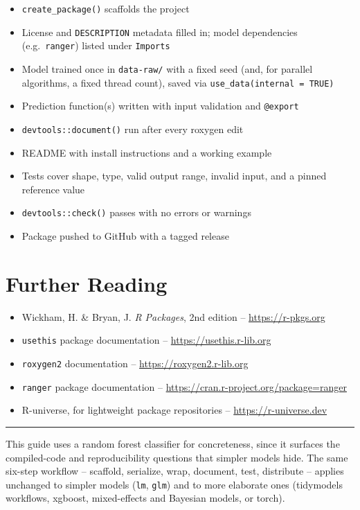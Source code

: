 \documentclass[11pt]{article}
\begin{document}
\begin{tcolorbox}[breakable, enhanced, colback=green!4, colframe=green!40!black,
  boxrule=0.6pt, arc=2pt, left=8pt, right=8pt, top=6pt, bottom=6pt]
\begin{itemize}[itemsep=3pt, leftmargin=1.4em]
  \item[\textbf{$\square$}] \texttt{create\_package()} scaffolds the project
  \item[\textbf{$\square$}] License and \texttt{DESCRIPTION} metadata filled in; model dependencies (e.g.\ \texttt{ranger}) listed under \texttt{Imports}
  \item[\textbf{$\square$}] Model trained once in \texttt{data-raw/} with a fixed seed (and, for parallel algorithms, a fixed thread count), saved via \texttt{use\_data(internal = TRUE)}
  \item[\textbf{$\square$}] Prediction function(s) written with input validation and \texttt{@export}
  \item[\textbf{$\square$}] \texttt{devtools::document()} run after every roxygen edit
  \item[\textbf{$\square$}] README with install instructions and a working example
  \item[\textbf{$\square$}] Tests cover shape, type, valid output range, invalid input, and a pinned reference value
  \item[\textbf{$\square$}] \texttt{devtools::check()} passes with no errors or warnings
  \item[\textbf{$\square$}] Package pushed to GitHub with a tagged release
\end{itemize}
\end{tcolorbox}

\section{Further Reading}

\begin{itemize}[itemsep=2pt]
  \item Wickham, H. \& Bryan, J. \textit{R Packages}, 2nd edition -- \url{https://r-pkgs.org}
  \item \texttt{usethis} package documentation -- \url{https://usethis.r-lib.org}
  \item \texttt{roxygen2} documentation -- \url{https://roxygen2.r-lib.org}
  \item \texttt{ranger} package documentation -- \url{https://cran.r-project.org/package=ranger}
  \item R-universe, for lightweight package repositories -- \url{https://r-universe.dev}
\end{itemize}

\vspace{0.6cm}
\hrule
\vspace{0.3cm}
\small\textcolor{rgray}{This guide uses a random forest classifier for concreteness, since it surfaces the compiled-code and reproducibility questions that simpler models hide. The same six-step workflow -- scaffold, serialize, wrap, document, test, distribute -- applies unchanged to simpler models (\texttt{lm}, \texttt{glm}) and to more elaborate ones (tidymodels workflows, xgboost, mixed-effects and Bayesian models, or torch).}
\end{document}
